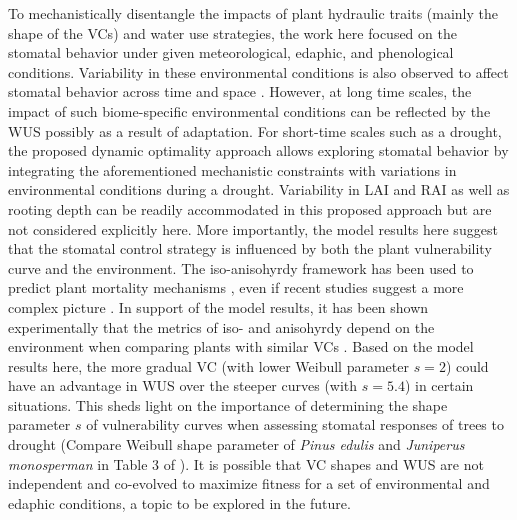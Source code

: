 \documentclass[utf8]{frontiersSCNS} %
\begin{document}
To mechanistically disentangle the impacts of plant hydraulic traits (mainly the shape of the VCs) and water use strategies, the work here focused on the stomatal behavior under given meteorological, edaphic, and phenological conditions. Variability in these environmental conditions is also observed to affect stomatal behavior across time and space \citep{feng2018beyond,novick2019beyond}. However, at long time scales, the impact of such biome-specific environmental conditions can be reflected by the WUS possibly as a result of adaptation. For short-time scales such as a drought, the proposed dynamic optimality approach allows exploring stomatal behavior by integrating the aforementioned mechanistic constraints with variations in environmental conditions during a drought. Variability in LAI and RAI as well as rooting depth can be readily accommodated in this proposed approach but are not considered explicitly here. More importantly, the model results here suggest that the stomatal control strategy is influenced by both the plant vulnerability curve and the environment. The iso-anisohyrdy framework has been used to predict plant mortality mechanisms \citep{mcdowell_mechanisms_2008}, even if recent studies suggest a more complex picture \citep{meinzer_dynamics_2014,martinezvilalta_water_2017}. In support of the model results, it has been shown experimentally that the metrics of iso- and anisohyrdy depend on the environment when comparing plants with similar VCs \citep{hochberg_iso/anisohydry:_2018}.  Based on the model results here, the more gradual VC (with lower Weibull parameter $s=2$) could have an advantage in WUS over the steeper curves (with $s=5.4$) in certain situations. This sheds light on the importance of determining the shape parameter $s$ of vulnerability curves when assessing stomatal responses of trees to drought (Compare Weibull shape parameter of \textit{Pinus edulis} and \textit{Juniperus monosperman} in Table 3 of \citet{plaut_hydraulic_2012}). It is possible that VC shapes and WUS are not independent and co-evolved to maximize fitness for a set of environmental and edaphic conditions, a topic to be explored in the future. 
\end{document}
